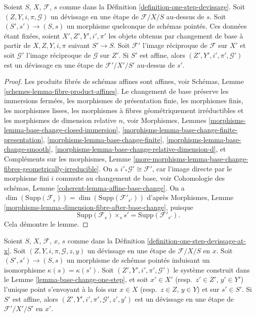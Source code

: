 \begin{lemma}
\label{lemma-base-change-one-step}
Soient $S$, $X$, $\mathcal{F}$, $s$ comme dans la
Définition \ref{definition-one-step-devissage}.
Soit $(Z, Y, i, \pi, \mathcal{G})$ un d\'evissage en une étape
de $\mathcal{F}/X/S$ au-dessus de $s$.
Soit $(S', s') \to (S, s)$ un morphisme quelconque de schémas pointés.
Ces données étant fixées, soient $X', Z', Y', i', \pi'$ les objets obtenus par changement
de base à partir de $X, Z, Y, i, \pi$ suivant $S' \to S$.
Soit $\mathcal{F}'$ l'image réciproque de $\mathcal{F}$ sur $X'$
et soit $\mathcal{G}'$ l'image réciproque de $\mathcal{G}$ sur $Z'$.
Si $S'$ est affine, alors $(Z', Y', i', \pi', \mathcal{G}')$
est un d\'evissage en une étape de $\mathcal{F}'/X'/S'$ au-dessus de $s'$.
\end{lemma}

\begin{proof}
Les produits fibrés de schémas affines sont affines, voir
Schémas, Lemme \ref{schemes-lemma-fibre-product-affines}.
Le changement de base préserve
les immersions fermées,
les morphismes de présentation finie,
les morphismes finis,
les morphismes lisses,
les morphismes à fibres géométriquement irréductibles et
les morphismes de dimension relative $n$, voir
Morphismes, Lemmes \ref{morphisms-lemma-base-change-closed-immersion},
\ref{morphisms-lemma-base-change-finite-presentation},
\ref{morphisms-lemma-base-change-finite},
\ref{morphisms-lemma-base-change-smooth},
\ref{morphisms-lemma-base-change-relative-dimension-d}, et
Compléments sur les morphismes, Lemme
\ref{more-morphisms-lemma-base-change-fibres-geometrically-irreducible}.
On a $i'_*\mathcal{G}' \cong \mathcal{F}'$, car l'image directe
par le morphisme fini $i$ commute au changement de base, voir
Cohomologie des schémas, Lemme \ref{coherent-lemma-affine-base-change}.
On a
$\dim(\text{Supp}(\mathcal{F}_s)) = \dim(\text{Supp}(\mathcal{F}'_{s'}))$
d'après
Morphismes, Lemme \ref{morphisms-lemma-dimension-fibre-after-base-change},
puisque
$$
\text{Supp}(\mathcal{F}_s) \times_s s' = \text{Supp}(\mathcal{F}'_{s'}).
$$
Cela démontre le lemme.
\end{proof}

\begin{lemma}
\label{lemma-base-change-one-step-at-x}
Soient $S$, $X$, $\mathcal{F}$, $x$, $s$ comme dans la
Définition \ref{definition-one-step-devissage-at-x}.
Soit $(Z, Y, i, \pi, \mathcal{G}, z, y)$ un d\'evissage en une étape
de $\mathcal{F}/X/S$ en $x$.
Soit $(S', s') \to (S, s)$ un morphisme de schémas pointés
induisant un isomorphisme $\kappa(s) = \kappa(s')$.
Soit $(Z', Y', i', \pi', \mathcal{G}')$ le système construit dans le
Lemme \ref{lemma-base-change-one-step},
et soit $x' \in X'$ (resp.\ $z' \in Z'$, $y' \in Y'$) l'unique
point s'envoyant à la fois sur $x \in X$ (resp.\ $z \in Z$, $y \in Y$)
et sur $s' \in S'$.
Si $S'$ est affine, alors $(Z', Y', i', \pi', \mathcal{G}', z', y')$
est un d\'evissage en une étape de $\mathcal{F}'/X'/S'$ en $x'$.
\end{lemma}

